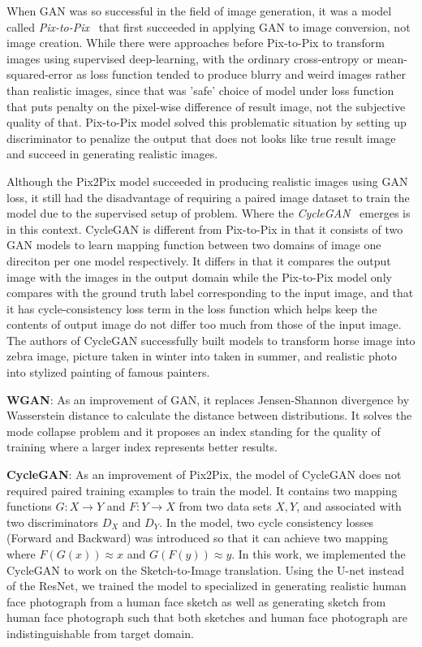 When GAN was so successful in the field of image generation, it was a model called \emph{Pix-to-Pix}~\cite{pix2pix} that first succeeded in applying GAN to image conversion, not image creation. While there were approaches before Pix-to-Pix to transform images using supervised deep-learning, with the ordinary cross-entropy or mean-squared-error as loss function tended to produce blurry and weird images rather than realistic images, since that was 'safe' choice of model under loss function that puts penalty on the pixel-wise difference of result image, not the subjective quality of that. Pix-to-Pix model solved this problematic situation by setting up discriminator to penalize the output that does not looks like true result image and succeed in generating realistic images.

Although the Pix2Pix model succeeded in producing realistic images using GAN loss, it still had the disadvantage of requiring a paired image dataset to train the model due to the supervised setup of problem. Where the \emph{CycleGAN}~\cite{CycleGAN} emerges is in this context. CycleGAN is different from Pix-to-Pix in that it consists of two GAN models to learn mapping function between two domains of image one direciton per one model respectively. It differs in that it compares the output image with the images in the output domain while the Pix-to-Pix model only compares with the ground truth label corresponding to the input image, and that it has cycle-consistency loss term in the loss function which helps keep the contents of output image do not differ too much from those of the input image. The authors of CycleGAN successfully built models to transform horse image into zebra image, picture taken in winter into taken in summer, and realistic photo into stylized painting of famous painters.


\textbf{WGAN}: As an improvement of GAN, it replaces Jensen-Shannon divergence by Wasserstein distance to calculate the distance between distributions. It solves the mode collapse problem and it proposes an index standing for the quality of training where a larger index represents better results.


\textbf{CycleGAN}: As an improvement of Pix2Pix, the model of CycleGAN does not required paired training examples to train the model. It contains two mapping functions $G:X\rightarrow Y$ and $F:Y\rightarrow X$ from two data sets $X,Y$, and associated with two discriminators $D_{X}$ and $D_{Y}$. In the model, two cycle consistency losses (Forward and Backward) was introduced so that it can achieve two mapping where $F(G(x))\approx x$ and $G(F(y))\approx y$\cite{CycleGAN}. In this work, we implemented the CycleGAN to work on the Sketch-to-Image translation. Using the U-net instead of the ResNet, we trained the model to specialized in generating realistic human face photograph from a human face sketch as well as generating sketch from human face photograph such that both sketches and human face photograph are indistinguishable from target domain.

